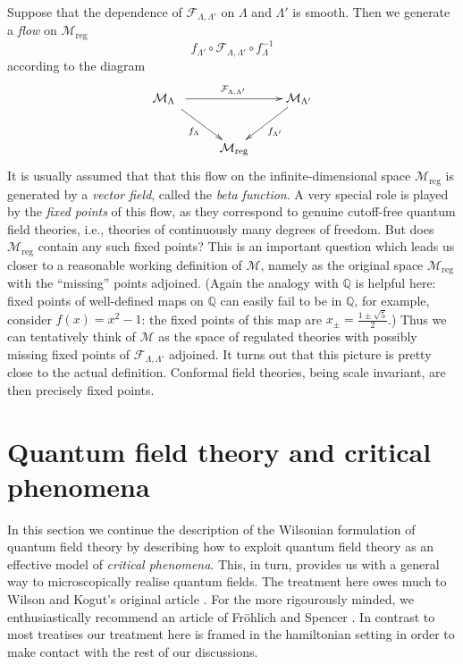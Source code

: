 \documentclass[11pt]{amsart}
\theoremstyle{plain}%
\theoremstyle{definition}
\theoremstyle{remark}
\begin{document}
Suppose that the dependence of $\mathcal{F}_{\Lambda,\Lambda'}$ on $\Lambda$ and $\Lambda'$ is smooth.  Then we generate a \emph{flow} on $\mathcal{M}_{\text{reg}}$ 
\begin{equation}
	f_{\Lambda'}\circ \mathcal{F}_{\Lambda,\Lambda'}\circ f_\Lambda^{-1}   
\end{equation}   
according to the diagram
\begin{equation}
\xymatrix{
\mathcal{M}_{\Lambda} \ar[rr]^{\mathcal{F}_{\Lambda,\Lambda'}}
\ar[dr]_{f_\Lambda}\hole
&& \mathcal{M}_{\Lambda'} \ar[dl]^{f_{\Lambda'}}\\
& \mathcal{M}_{\text{reg}} }
\end{equation}
It is usually assumed  that that this flow on the infinite-dimensional space $\mathcal{M}_{\text{reg}}$ is generated by a \emph{vector field}, called the \emph{beta function}. A very special role is played by the \emph{fixed points} of this flow, as they correspond to genuine cutoff-free quantum field theories, i.e., theories of continuously many degrees of freedom. But does $\mathcal{M}_{\text{reg}}$ contain any such fixed points? This is an important question which leads us closer to a reasonable working definition of $\mathcal{M}$, namely as the original space $\mathcal{M}_{\text{reg}}$ with the ``missing'' points adjoined. (Again the analogy with $\mathbb{Q}$ is helpful here: fixed points of well-defined maps on $\mathbb{Q}$ can easily fail to be in $\mathbb{Q}$, for example, consider $f(x) = x^2-1$: the fixed points of this map are $x_{\pm} = \frac{1\pm\sqrt{5}}{2}$.) Thus we can tentatively think of $\mathcal{M}$ as the space of regulated theories with possibly missing fixed points of $\mathcal{F}_{\Lambda,\Lambda'}$ adjoined. It turns out that this picture is pretty close to the actual definition. Conformal field theories, being scale invariant, are then precisely fixed points.

\section{Quantum field theory and critical phenomena}
In this section we continue the description of the Wilsonian formulation of quantum field theory by describing how to exploit quantum field theory as an effective model of \emph{critical phenomena}. This, in turn, provides us with a general way to microscopically realise quantum fields. The treatment here owes much to Wilson and Kogut's original article \cite{wilson_renormalization_1974}. For the more rigourously minded, we enthusiastically recommend an article of Fr\"ohlich and Spencer \cite{frohlich_recent_1981}. In contrast to most treatises our treatment here is framed in the hamiltonian setting in order to make contact with the rest of our discussions.
\end{document}
